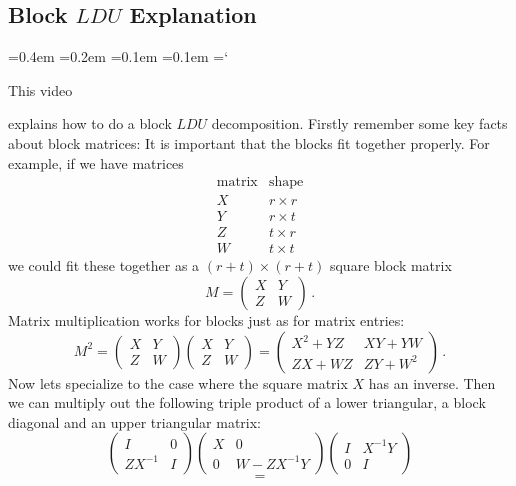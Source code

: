 
\subsection*{Block $LDU$ Explanation}

{\ttfamily
{}\font=0.4em
\font=0.2em
\font=0.1em
\font=0.1em
\hyphenchar\font=`\-


\hypertarget{scripts_lu_decomposition_blocks}{This video} explains how to do a block $LDU$ decomposition.
Firstly remember some key facts about block matrices: It is important that the blocks fit together properly.
For example, if we have matrices
\[
\begin{array}{c|c} \mbox{matrix}&\mbox{shape}\\\hline
X&r\times r\\
Y&r\times t\\
Z&t\times r\\
W& t\times t
\end{array}
\]
we could fit these together as a $(r+t)\times(r+t)$ square block matrix
\[
M=\left(\begin{array}{c|c}X&Y\\\hline Z&W\end{array}\right)\, .
\]
Matrix multiplication works for blocks just as for matrix entries:
\[
M^2 = \left(\begin{array}{c|c}X&Y\\\hline Z&W\end{array}\right)\left(\begin{array}{c|c}X&Y\\\hline Z&W\end{array}\right)
=\left(\begin{array}{c|c}X^2 + YZ&XY+YW\\\hline ZX+WZ&ZY+W^2\end{array}\right)\, .
\]
Now lets specialize to the case where the square matrix $X$ has an inverse. Then we can multiply out the following triple product of a lower triangular, a block diagonal and an
upper triangular matrix:
\[
\left(\begin{array}{c|c}I&0\\\hline ZX^{-1}&I\end{array}\right)\left(\begin{array}{c|c}X&0\\\hline 0&W-ZX^{-1}Y\end{array}\right)
\left(\begin{array}{c|c}I&X^{-1}Y\\\hline 0&I\end{array}\right)\] \[=
\]}
